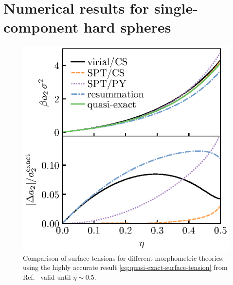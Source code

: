 \documentclass[11pt,twoside]{report}
\begin{document}

\section{Numerical results for single-component hard spheres}

\begin{figure}
  \includegraphics[width=0.9\linewidth,outer]{resummation-a2}
  \caption[Accuracy of surface tension obtained from partially resumming the virial series]{
    Comparison of surface tensions for different morphometric theories.
  using the highly accurate result \eqref{eq:quasi-exact-surface-tension} from Ref.\ \cite{DavidchackMP2015} valid until $\eta \sim 0.5$.}
  \label{fig:resummation-a2}
\end{figure}
\end{document}
